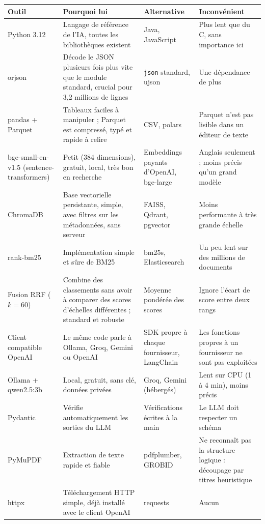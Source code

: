 \documentclass[11pt,a4paper]{article}
\newcommand{\code}[1]{\texttt{#1}}
\begin{document}
\begin{longtable}{>{\raggedright\arraybackslash}p{2.6cm}>{\raggedright\arraybackslash}p{4.6cm}>{\raggedright\arraybackslash}p{3.6cm}>{\raggedright\arraybackslash}p{3.8cm}}
\toprule
Outil & Pourquoi lui & Alternative & Inconvénient \\
\midrule
\endhead
Python 3.12 & Langage de référence de l'IA, toutes les bibliothèques existent &
Java, JavaScript & Plus lent que du C, sans importance ici \\
orjson & Décode le JSON plusieurs fois plus vite que le module standard, crucial pour
3,2 millions de lignes & \code{json} standard, ujson & Une dépendance de plus \\
pandas + Parquet & Tableaux faciles à manipuler ; Parquet est compressé, typé et rapide
à relire & CSV, polars & Parquet n'est pas lisible dans un éditeur de texte \\
bge-small-en-v1.5 (sentence-transformers) & Petit (384 dimensions), gratuit, local, très
bon en recherche & Embeddings payants d'OpenAI, bge-large & Anglais seulement ; moins précis
qu'un grand modèle \\
ChromaDB & Base vectorielle persistante, simple, avec filtres sur les métadonnées, sans
serveur & FAISS, Qdrant, pgvector & Moins performante à très grande échelle \\
rank-bm25 & Implémentation simple et sûre de BM25 & bm25s, Elasticsearch & Un peu lent sur
des millions de documents \\
Fusion RRF ($k=60$) & Combine des classements sans avoir à comparer des scores d'échelles
différentes ; standard et robuste & Moyenne pondérée des scores & Ignore l'écart de score
entre deux rangs \\
Client compatible OpenAI & Le même code parle à Ollama, Groq, Gemini ou OpenAI & SDK propre
à chaque fournisseur, LangChain & Les fonctions propres à un fournisseur ne sont pas
exploitées \\
Ollama + qwen2.5:3b & Local, gratuit, sans clé, données privées & Groq, Gemini (hébergés) &
Lent sur CPU (1 à 4 min), moins précis \\
Pydantic & Vérifie automatiquement les sorties du LLM & Vérifications écrites à la main &
Le LLM doit respecter un schéma \\
PyMuPDF & Extraction de texte rapide et fiable & pdfplumber, GROBID & Ne reconnaît pas la
structure logique : découpage par titres heuristique \\
httpx & Téléchargement HTTP simple, déjà installé avec le client OpenAI & requests & Aucun \\

\end{longtable}
\end{document}
